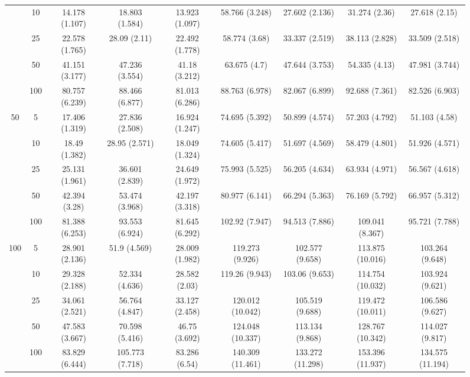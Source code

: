 \documentclass[10pt]{article}
\theoremstyle{definition}
\begin{document}
\begin{sidewaysfigure}
\begin{tabular}{cc|ccc|cccc}
    & 10 & 14.178 (1.107) & 18.803 (1.584) & 13.923 (1.097) & 58.766 (3.248) & 27.602 (2.136) & 31.274 (2.36) & 27.618 (2.15) \\ 
    & 25 & 22.578 (1.765) & 28.09 (2.11) & 22.492 (1.778) & 58.774 (3.68) & 33.337 (2.519) & 38.113 (2.828) & 33.509 (2.518) \\ 
    & 50 & 41.151 (3.177) & 47.236 (3.554) & 41.18 (3.212) & 63.675 (4.7) & 47.644 (3.753) & 54.335 (4.13) & 47.981 (3.744) \\ 
    & 100 & 80.757 (6.239) & 88.466 (6.877) & 81.013 (6.286) & 88.763 (6.978) & 82.067 (6.899) & 92.688 (7.361) & 82.526 (6.903) \\ 
   \multirow{5}{*}{50} & 5 & 17.406 (1.319) & 27.836 (2.508) & 16.924 (1.247) & 74.695 (5.392) & 50.899 (4.574) & 57.203 (4.792) & 51.103 (4.58) \\ 
    & 10 & 18.49 (1.382) & 28.95 (2.571) & 18.049 (1.324) & 74.605 (5.417) & 51.697 (4.569) & 58.479 (4.801) & 51.926 (4.571) \\ 
    & 25 & 25.131 (1.961) & 36.601 (2.839) & 24.649 (1.972) & 75.993 (5.525) & 56.205 (4.634) & 63.934 (4.971) & 56.567 (4.618) \\ 
    & 50 & 42.394 (3.28) & 53.474 (3.968) & 42.197 (3.318) & 80.977 (6.141) & 66.294 (5.363) & 76.169 (5.792) & 66.957 (5.312) \\ 
    & 100 & 81.388 (6.253) & 93.553 (6.924) & 81.645 (6.292) & 102.92 (7.947) & 94.513 (7.886) & 109.041 (8.367) & 95.721 (7.788) \\ 
   \multirow{5}{*}{100} & 5 & 28.901 (2.136) & 51.9 (4.569) & 28.009 (1.982) & 119.273 (9.926) & 102.577 (9.658) & 113.875 (10.016) & 103.264 (9.648) \\ 
    & 10 & 29.328 (2.188) & 52.334 (4.636) & 28.582 (2.03) & 119.26 (9.943) & 103.06 (9.653) & 114.754 (10.032) & 103.924 (9.621) \\ 
    & 25 & 34.061 (2.521) & 56.764 (4.847) & 33.127 (2.458) & 120.012 (10.042) & 105.519 (9.688) & 119.472 (10.011) & 106.586 (9.627) \\ 
    & 50 & 47.583 (3.667) & 70.598 (5.416) & 46.75 (3.692) & 124.048 (10.337) & 113.134 (9.868) & 128.767 (10.342) & 114.027 (9.817) \\ 
    & 100 & 83.829 (6.444) & 105.773 (7.718) & 83.286 (6.54) & 140.309 (11.461) & 133.272 (11.298) & 153.396 (11.937) & 134.575 (11.194) \\ 
\end{tabular}
\end{sidewaysfigure}
\end{document}
